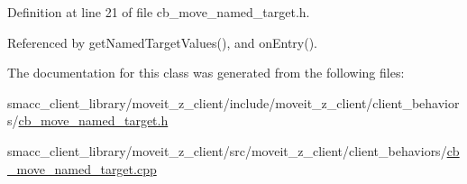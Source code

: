 Definition at line 21 of file cb\+\_\+move\+\_\+named\+\_\+target.\+h.



Referenced by get\+Named\+Target\+Values(), and on\+Entry().



The documentation for this class was generated from the following files\+:\begin{DoxyCompactItemize}
\item 
smacc\+\_\+client\+\_\+library/moveit\+\_\+z\+\_\+client/include/moveit\+\_\+z\+\_\+client/client\+\_\+behaviors/\hyperlink{cb__move__named__target_8h}{cb\+\_\+move\+\_\+named\+\_\+target.\+h}\item 
smacc\+\_\+client\+\_\+library/moveit\+\_\+z\+\_\+client/src/moveit\+\_\+z\+\_\+client/client\+\_\+behaviors/\hyperlink{cb__move__named__target_8cpp}{cb\+\_\+move\+\_\+named\+\_\+target.\+cpp}\end{DoxyCompactItemize}
